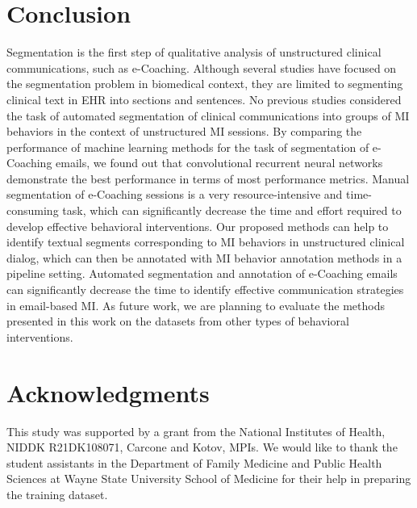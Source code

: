 \documentclass{amia}
\begin{document}
 
\section*{Conclusion}

Segmentation is the first step of qualitative analysis of unstructured clinical communications, such as e-Coaching. Although several studies have focused on the segmentation problem in biomedical context, they are limited to segmenting clinical text in EHR into sections and sentences. No previous studies considered the task of automated segmentation of clinical communications into groups of MI behaviors in the context of unstructured MI sessions. By comparing the performance of machine learning methods for the task of segmentation of e-Coaching emails, we found out that convolutional recurrent neural networks demonstrate the best performance in terms of most performance metrics. Manual segmentation of e-Coaching sessions is a very resource-intensive and time-consuming task, which can significantly decrease the time and effort required to develop effective behavioral interventions. Our proposed methods can help to identify textual segments corresponding to MI behaviors in unstructured clinical dialog, which can then be annotated with MI behavior annotation methods in a pipeline setting. Automated segmentation and annotation of e-Coaching emails can significantly decrease the time to identify effective communication strategies in email-based MI. As future work, we are planning to evaluate the methods presented in this work on the datasets from other types of behavioral interventions.

\section*{Acknowledgments}
This study was supported by a grant from the National Institutes of Health, NIDDK R21DK108071, Carcone and Kotov, MPIs. We would like to thank the student assistants in the Department of Family Medicine and Public Health Sciences at Wayne State University School of Medicine for their help in preparing the training dataset. 



\end{document}
